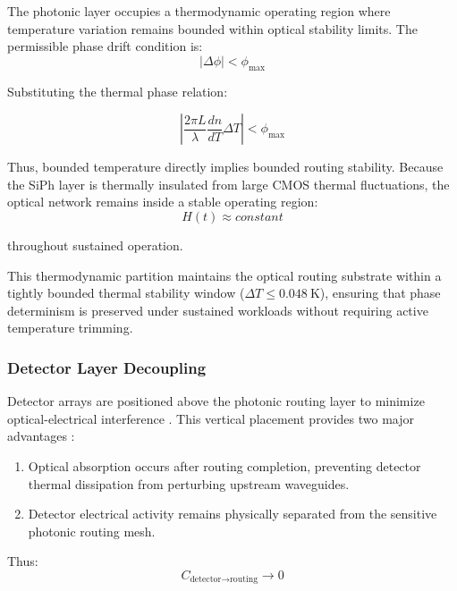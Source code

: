 \documentclass[journal]{IEEEtran}
\begin{document}
The photonic layer occupies a thermodynamic operating region where temperature variation remains bounded within optical stability limits.
The permissible phase drift condition is:
\begin{equation}
|\Delta \phi| < \phi_{\text{max}}
\end{equation}

Substituting the thermal phase relation:

\begin{equation}
| \frac {2 \pi L}{\lambda} \frac{dn}{dT} \Delta T |
< \phi_{\text{max}}
\end{equation}

Thus, bounded temperature directly implies bounded routing stability. Because the SiPh layer is thermally insulated from large CMOS thermal fluctuations, the optical network remains inside a stable operating region:
\begin{equation}
H(t) \approx constant 
\end{equation}

throughout sustained operation.

This thermodynamic partition maintains the optical routing substrate within a tightly bounded thermal stability window ($\Delta T \le 0.048~\mathrm{K}$), ensuring that phase determinism is preserved under sustained workloads without requiring active temperature trimming.

\subsubsection{\textbf{Detector Layer Decoupling}}

Detector arrays are positioned above the photonic routing layer to minimize optical-electrical interference \cite{Steckler2024,Chen2025}.  This vertical placement provides two major advantages :

\begin{enumerate}
\item  Optical absorption occurs after routing completion, preventing detector thermal dissipation from perturbing upstream waveguides.
\item  Detector electrical activity remains physically separated from the sensitive photonic routing mesh.
\end{enumerate}

Thus:
\begin{equation}
C_{\text{detector} \rightarrow \text{routing}} \rightarrow 0 
\end{equation}
\end{document}
